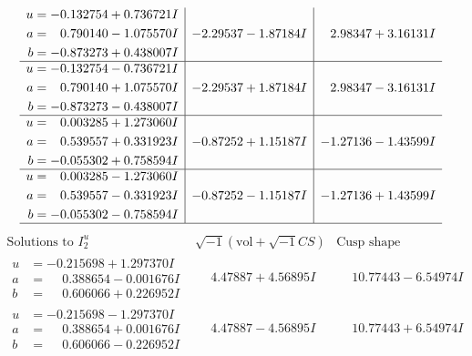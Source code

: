 \documentclass[1p]{elsarticle_modified}
\theoremstyle{definition}
\newcommand{\I}{\sqrt{-1}}
\begin{document}
$$\begin{array}{c|c|c}
\begin{aligned}
u &= -0.132754 + 0.736721 I \\
a &= \phantom{-}0.790140 - 1.075570 I \\
b &= -0.873273 + 0.438007 I\end{aligned}
 & -2.29537 - 1.87184 I & \phantom{-}2.98347 + 3.16131 I \\ \hline\begin{aligned}
u &= -0.132754 - 0.736721 I \\
a &= \phantom{-}0.790140 + 1.075570 I \\
b &= -0.873273 - 0.438007 I\end{aligned}
 & -2.29537 + 1.87184 I & \phantom{-}2.98347 - 3.16131 I \\ \hline\begin{aligned}
u &= \phantom{-}0.003285 + 1.273060 I \\
a &= \phantom{-}0.539557 + 0.331923 I \\
b &= -0.055302 + 0.758594 I\end{aligned}
 & -0.87252 + 1.15187 I & -1.27136 - 1.43599 I \\ \hline\begin{aligned}
u &= \phantom{-}0.003285 - 1.273060 I \\
a &= \phantom{-}0.539557 - 0.331923 I \\
b &= -0.055302 - 0.758594 I\end{aligned}
 & -0.87252 - 1.15187 I & -1.27136 + 1.43599 I\\
 \hline 
 \end{array}$$\newpage$$\begin{array}{c|c|c}  
\text{Solutions to }I^u_{2}& \I (\text{vol} + \sqrt{-1}CS) & \text{Cusp shape}\\
 \hline 
\begin{aligned}
u &= -0.215698 + 1.297370 I \\
a &= \phantom{-}0.388654 - 0.001676 I \\
b &= \phantom{-}0.606066 + 0.226952 I\end{aligned}
 & \phantom{-}4.47887 + 4.56895 I & \phantom{-}10.77443 - 6.54974 I \\ \hline\begin{aligned}
u &= -0.215698 - 1.297370 I \\
a &= \phantom{-}0.388654 + 0.001676 I \\
b &= \phantom{-}0.606066 - 0.226952 I\end{aligned}
 & \phantom{-}4.47887 - 4.56895 I & \phantom{-}10.77443 + 6.54974 I \\ \hline\begin{aligned}

\end{aligned}
\end{array}$$
\end{document}
